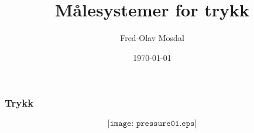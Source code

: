 \documentclass[aspectratio=169,xcolor=dvipsnames]{beamer}
\title[Trykk]{Målesystemer for trykk} %
\author[Fred-Olav] {Fred-Olav Mosdal}
\institute[Gand VGS] %
{
    Gand VGS \\
    VG3 Automasjon
}
\date{\today} %
\begin{document}
%
%
\begin{frame}
\titlepage
\end{frame}
%





%
%
%
\begin{frame}
	\frametitle{Trykk}

	$$\texttt{[image: pressure01.eps]}$$
\end{frame}
\end{document}
